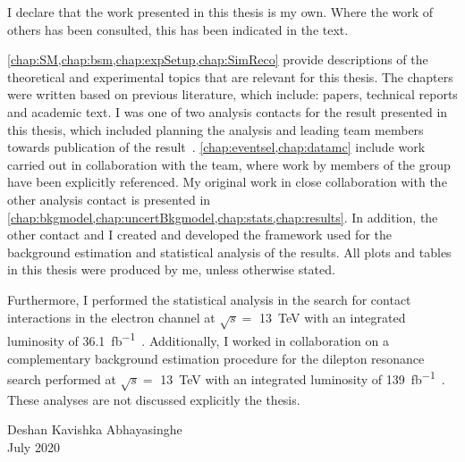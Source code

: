 
\cleardoublepage{}
\begin{declaration}
    I declare that the work presented in this thesis is my own.
    Where the work of others has been consulted, this has been indicated in the text.

    \cref{chap:SM,chap:bsm,chap:expSetup,chap:SimReco} provide descriptions of the theoretical and experimental topics that are relevant for this thesis. The chapters were written based on previous literature, which include: papers, technical reports and academic text. I was one of two analysis contacts for the result presented in this thesis, which included planning the analysis and leading team members towards publication of the result~\cite{Aad:2020otl}. \cref{chap:eventsel,chap:datamc} include work carried out in collaboration with the team, where work by members of the group have been explicitly referenced. My original work in close collaboration with the other analysis contact is presented in \cref{chap:bkgmodel,chap:uncertBkgmodel,chap:stats,chap:results}. In addition, the other contact and I created and developed the framework used for the background estimation and statistical analysis of the results. All plots and tables in this thesis were produced by me, unless otherwise stated. 

    Furthermore, I performed the statistical analysis in the search for contact interactions in the electron channel at $\sqrt{s} = $ \SI{13}{\tera\electronvolt} with an integrated luminosity of \SI{36.1}{\femto\barn^{-1}}~\cite{EXOT-2016-05}. Additionally, I worked in collaboration on a complementary background estimation procedure for the dilepton resonance search performed  at $\sqrt{s} = $ \SI{13}{\tera\electronvolt} with an integrated luminosity of \SI{139}{\femto\barn^{-1}}~\cite{Aad:2019fac}. These analyses are not discussed explicitly the thesis. 
    \vspace*{1.5cm}
    \begin{flushright}
        Deshan Kavishka Abhayasinghe \\
        July 2020
    \end{flushright}
\end{declaration}


